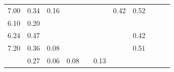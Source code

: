 \begin{refsection}[referencesCh3]
\begin{table}
\begin{adjustbox}{scale=0.8,center}
\begin{tabular}{@{}ccccccccccc@{}}
		7.00                                                         & 0.34                                                & 0.16                                                &                                                     &                                                     &                                                      & 0.42                                                & 0.52                                                  &                                                         &                                                      & \cite{Bolzonella}                            \\
		6.10                                                         & 0.20                                                &                                                     &                                                     &                                                     &                                                      &                                                     &                                                       &                                                         &                                                      & \cite{Gell}                                \\
		6.24                                                         & 0.47                                                &                                                     &                                                     &                                                     &                                                      &                                                     & 0.42                                                  &                                                         &                                                      & \cite{Moset}                                \\
		7.20                                                         & 0.36                                                & 0.08                                                &                                                     &                                                     &                                                      &                                                     & 0.51                                                  &                                                         &                                                      & \cite{Ledda}                                \\
		& 0.27                                                & 0.06                                                & 0.08                                                &                                                     & 0.13                                                 &                                                     &                                                       &                                                         &                                                      & \cite{Kirchmann} \\

\end{tabular}
\end{adjustbox}
\end{table}
\end{refsection}
